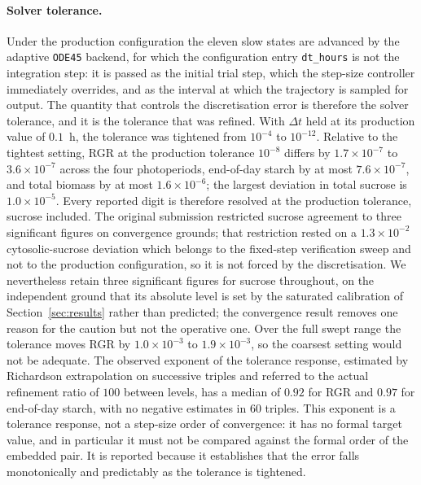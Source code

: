 \documentclass[a4paper,fleqn]{cas-sc}
\begin{document}
\paragraph{Solver tolerance.}
Under the production configuration the eleven slow states are advanced by the
adaptive \texttt{ODE45} backend, for which the configuration entry
\texttt{dt\_hours} is not the integration step: it is passed as the initial
trial step, which the step-size controller immediately overrides, and as the
interval at which the trajectory is sampled for output. The quantity that
controls the discretisation error is therefore the solver tolerance, and it is
the tolerance that was refined. With $\Delta t$ held at its production value of
$0.1$~h, the tolerance was tightened from $10^{-4}$ to $10^{-12}$. Relative to
the tightest setting, RGR at the production tolerance $10^{-8}$ differs by
$1.7\times10^{-7}$ to $3.6\times10^{-7}$ across the four photoperiods,
end-of-day starch by at most $7.6\times10^{-7}$, and total biomass by at most
$1.6\times10^{-6}$; the largest deviation in total sucrose is
$1.0\times10^{-5}$. Every reported digit is therefore resolved at the
production tolerance, sucrose included. The original submission restricted
sucrose agreement to three significant figures on convergence grounds; that
restriction rested on a $1.3\times10^{-2}$ cytosolic-sucrose deviation which
belongs to the fixed-step verification sweep and not to the production
configuration, so it is not forced by the discretisation. We nevertheless
retain three significant figures for sucrose throughout, on the independent
ground that its absolute level is set by the saturated calibration of
Section~\ref{sec:results} rather than predicted; the convergence result
removes one reason for the caution but not the operative one. Over the full
swept range the tolerance moves RGR by
$1.0\times10^{-3}$ to $1.9\times10^{-3}$, so the coarsest setting would not be
adequate. The observed exponent of the tolerance response, estimated by
Richardson extrapolation on successive triples and referred to the actual
refinement ratio of $100$ between levels, has a median of $0.92$ for RGR and
$0.97$ for end-of-day starch, with no negative estimates in $60$ triples. This
exponent is a tolerance response, not a step-size order of convergence: it has
no formal target value, and in particular it must not be compared against the
formal order of the embedded pair. It is reported because it establishes that
the error falls monotonically and predictably as the tolerance is tightened.
\end{document}
